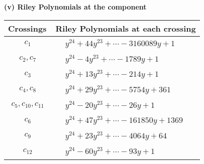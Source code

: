 \documentclass[1p]{elsarticle_modified}
\theoremstyle{definition}
\begin{document}
\newpage\renewcommand{\arraystretch}{1}
\flushleft \textbf{(v) Riley Polynomials at the component}\newline \\
\begin{tabular}{m{50pt}|m{274pt}}
Crossings & \hspace{64pt}Riley Polynomials at each crossing \\
\hline $$\begin{aligned}c_{1}\end{aligned}$$&$\begin{aligned}
&y^{24}+44 y^{23}+\cdots-3160089 y+1
\end{aligned}$\\
\hline $$\begin{aligned}c_{2},c_{7}\end{aligned}$$&$\begin{aligned}
&y^{24}-4 y^{23}+\cdots-1789 y+1
\end{aligned}$\\
\hline $$\begin{aligned}c_{3}\end{aligned}$$&$\begin{aligned}
&y^{24}+13 y^{23}+\cdots-214 y+1
\end{aligned}$\\
\hline $$\begin{aligned}c_{4},c_{8}\end{aligned}$$&$\begin{aligned}
&y^{24}+29 y^{23}+\cdots-5754 y+361
\end{aligned}$\\
\hline $$\begin{aligned}c_{5},c_{10},c_{11}\end{aligned}$$&$\begin{aligned}
&y^{24}-20 y^{23}+\cdots-26 y+1
\end{aligned}$\\
\hline $$\begin{aligned}c_{6}\end{aligned}$$&$\begin{aligned}
&y^{24}+47 y^{23}+\cdots-161850 y+1369
\end{aligned}$\\
\hline $$\begin{aligned}c_{9}\end{aligned}$$&$\begin{aligned}
&y^{24}+23 y^{23}+\cdots-4064 y+64
\end{aligned}$\\
\hline $$\begin{aligned}c_{12}\end{aligned}$$&$\begin{aligned}
&y^{24}-60 y^{23}+\cdots-93 y+1
\end{aligned}$\\
\hline
\end{tabular}\\~\\
\end{document}
